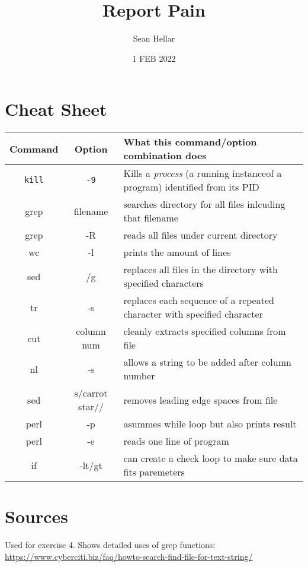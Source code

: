 \documentclass{article}
\title{Report Pain}
\date{1 FEB 2022}
\author{Sean Hellar}
\begin{document}
\maketitle
\newpage

\section{Cheat Sheet}

\begin{tabular}{|c|c|p{4.2in}|}
  \hline
  Command & Option & What this command/option combination does \\
  \hline
  \hline
  \texttt{kill} & \texttt{-9} & Kills a \emph{process} (a running instanceof a program) identified from its PID \\
  \hline
  \hline
  grep & filename & searches directory for all files inlcuding that filename \\
  \hline
  \hline
  grep & -R & reads all files under current directory \\
  \hline
  \hline
  wc & -l & prints the amount of lines \\
  \hline
  \hline
  sed & /g & replaces all files in the directory with specified characters \\
  \hline
  \hline
  tr & -s & replaces each sequence of a repeated character with specified character \\
  \hline
  \hline
  cut & column num & cleanly extracts specified columns from file \\
  \hline
  \hline
  nl & -s & allows a string to be added after column number \\
  \hline
  \hline
  sed & s/carrot star// & removes leading edge spaces from file \\
  \hline
  \hline
  perl & -p & asummes while loop but also prints result \\
  \hline
  \hline
  perl & -e & reads one line of program \\
  \hline
  \hline
  if & -lt/gt & can create a check loop to make sure data fits paremeters \\
  \hline
\end{tabular}




\newpage

\section{Sources}

Used for exercise 4. Shows detailed uses of grep functions:
\url{https://www.cyberciti.biz/faq/howto-search-find-file-for-text-string/}
\end{document}
